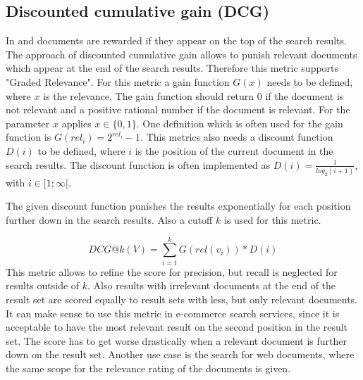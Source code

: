 \subsection{Discounted cumulative gain (DCG)}
\label{ref:qa:offlinemetrics:dcg}
In  and  documents are rewarded if they appear on the top of the search results.
The approach of discounted cumulative gain allows to punish relevant documents which appear at the end of the search results.
Therefore this metric supports "Graded Relevance"\cite[P. 1]{chapelle_metlzer_zhang_grinspan_2009}.
For this metric a gain function $G(x)$ needs to be defined, where $x$ is the relevance.
The gain function should return 0 if the document is not relevant and a positive rational number if the document is relevant.
For the parameter $x$ applies $x \in \{0,1\}$. One definition which is often used for the gain function is $G(rel_i) = 2^{rel_i} - 1$.
This metrics also needs a discount function $D(i)$ to be defined, where $i$ is the position of the current document in the search results.
The discount function is often implemented as $D(i) = \frac{1}{log_2(i+1)}$, with $i \in [1;\infty[$.
	
The given discount function punishes the results exponentially for each position further down in the search results.
Also a cutoff $k$ is used for this metric\cite[P. 420]{mcsherry_najork_2008}.
		
\begin{equation}
	DCG@k(V) = \sum_{i=1}^{k} G(rel(v_i))*D(i)
\end{equation}
This metric allows to refine the score for precision, but recall is neglected for results outside of $k$.
Also results with irrelevant documents at the end of the result set are scored equally to result sets with less, but only relevant documents.
It can make sense to use this metric in e-commerce search services, 
since it is acceptable to have the most relevant result on the second position in the result set.
The score has to get worse drastically when a relevant document is further down on the result set.
Another use case is the search for web documents, where the same scope for the relevance rating of the documents is given.\cite[P. 1]{chapelle_metlzer_zhang_grinspan_2009}
		
